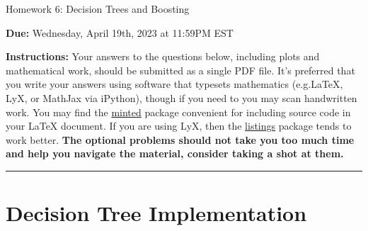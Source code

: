 \documentclass{article}
\newcommand{\ruleskip}{\bigskip\hrule\bigskip}
\theoremstyle{plain}
\theoremstyle{definition}
\begin{document}

\pagestyle{myheadings} 

\begin{center}
{\Large
Homework 6: Decision Trees and Boosting
} 
\end{center}

{
{ \color{nyupurple} \textbf{Due:} Wednesday, April 19th, 2023 at 11:59PM EST} 
} 

\textbf{Instructions: }Your answers to the questions below, including plots and mathematical work, should be submitted as a single PDF file.  It's preferred that you write your answers using software that typesets mathematics (e.g.LaTeX, LyX, or MathJax via iPython), though if you need to you may scan handwritten work.  You may find the \href{https://github.com/gpoore/minted}{minted} package convenient for including source code in your LaTeX document.  If you are using LyX, then the \href{https://en.wikibooks.org/wiki/LaTeX/Source_Code_Listings}{listings} package tends to work better. {\bf The optional problems should not take you too much time and help you navigate the material, consider taking a shot at them.}

\ruleskip




\section{Decision Tree Implementation}
\end{document}
